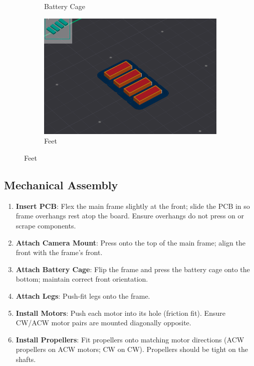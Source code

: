 \begin{manualblock}
\begin{figure}[H]
\begin{subfigure}[b]{0.48\linewidth}
    \caption{Battery Cage}
  \end{subfigure}
  \hfill
  \begin{subfigure}[b]{0.48\linewidth}
    \centering
    \includegraphics[width=\linewidth]{img/manual/3dp4.png}
    \caption{Feet}
  \end{subfigure}
\end{figure}


\subsection*{Mechanical Assembly}
\begin{enumerate}
  \item \textbf{Insert PCB}: Flex the main frame slightly at the front; slide the PCB in so frame overhangs rest atop the board. Ensure overhangs do not press on or scrape components.
  \item \textbf{Attach Camera Mount}: Press onto the top of the main frame; align the front with the frame’s front.
  \item \textbf{Attach Battery Cage}: Flip the frame and press the battery cage onto the bottom; maintain correct front orientation.
  \item \textbf{Attach Legs}: Push-fit legs onto the frame.
  \item \textbf{Install Motors}: Push each motor into its hole (friction fit). Ensure CW/ACW motor pairs are mounted diagonally opposite.
  \item \textbf{Install Propellers}: Fit propellers onto matching motor directions (ACW propellers on ACW motors; CW on CW). Propellers should be tight on the shafts.
\end{enumerate}


\end{manualblock}
